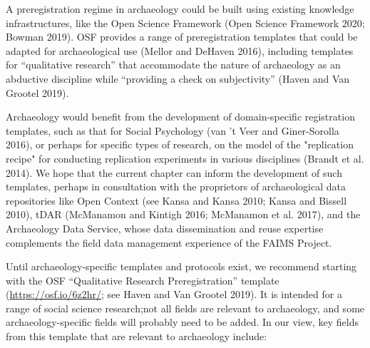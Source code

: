 \documentclass[article]{sa}
\begin{document}
A preregistration regime in archaeology could be built using existing
knowledge infrastructures, like the Open Science Framework (Open Science
Framework 2020; Bowman 2019). OSF provides a range of preregistration
templates that could be adapted for archaeological use (Mellor and
DeHaven 2016), including templates for ``qualitative research'' that
accommodate the nature of archaeology as an abductive discipline while
``providing a check on subjectivity'' (Haven and Van Grootel 2019).

Archaeology would benefit from the development of domain-specific
registration templates, such as that for Social Psychology (van 't Veer
and Giner-Sorolla 2016), or perhaps for specific types of research, on
the model of the "replication recipe" for conducting replication
experiments in various disciplines (Brandt et al. 2014). We hope that
the current chapter can inform the development of such templates,
perhaps in consultation with the proprietors of archaeological data
repositories like Open Context (see Kansa and Kansa 2010; Kansa and
Bissell 2010), tDAR (McManamon and Kintigh 2016; McManamon et al. 2017),
and the Archaeology Data Service, whose data dissemination and reuse
expertise complements the field data management experience of the FAIMS
Project.

Until archaeology-specific templates and protocols exist, we recommend
starting with the OSF ``Qualitative Research Preregistration'' template
(\href{https://osf.io/6z2hr/}{{https://osf.io/6z2hr/}}; see Haven and
Van Grootel 2019). It is intended for a range of social science
research;not all fields are relevant to archaeology, and some
archaeology-specific fields will probably need to be added. In our view,
key fields from this template that are relevant to archaeology include:
\end{document}
